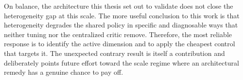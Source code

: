 On balance, the architecture this thesis set out to validate does not close the heterogeneity gap at this scale. The more useful conclusion to this work is that heterogeneity degrades the shared policy in specific and diagnosable ways that neither tuning nor the centralized critic remove. Therefore, the most reliable response is to identify the
active dimension and to apply the cheapest control that targets it. The unexpected contrary result is itself a contribution and deliberately points future effort toward the scale regime where an architectural remedy has a genuine chance to pay off.